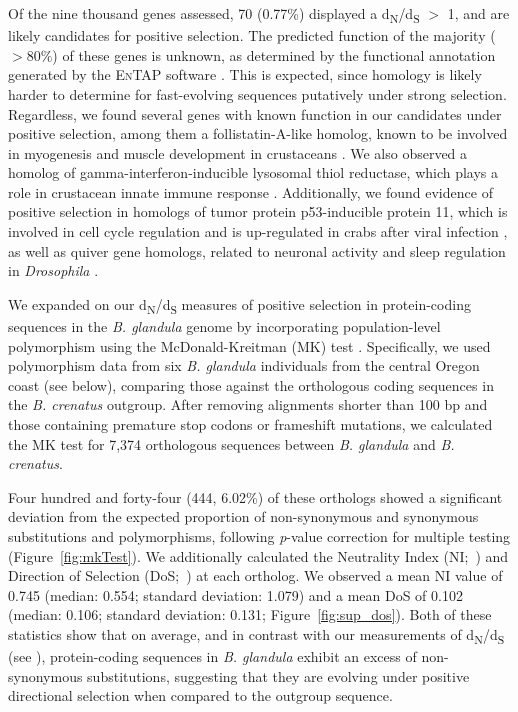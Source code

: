 \documentclass[11pt]{article}
\newcommand{\dnds}{d\textsubscript{N}/d\textsubscript{S}\xspace}
\newcommand{\bgla}{\textit{B. glandula}\xspace}
\begin{document}
Of the nine thousand genes assessed, 70 (0.77\%) displayed a \dnds{} $>$ 1, and are likely
candidates for positive selection.
The predicted function of the majority ($>80\%$) of these genes is unknown, as
determined by the functional annotation generated by the \textsc{EnTAP} software
\citep{hart_span_2020}.
This is expected, since homology is likely harder to determine for fast-evolving sequences
putatively under strong selection.
Regardless, we found several genes with known function in our candidates under
positive selection, among them a follistatin-A-like homolog, known to be involved in
myogenesis and muscle development in crustaceans \citep{yan_identification_2021}.
We also observed a homolog of gamma-interferon-inducible lysosomal thiol reductase,
which plays a role in crustacean innate immune response \citep{liu_involvement_2019}.
Additionally, we found evidence of positive selection in homologs of tumor protein
p53-inducible protein 11, which is involved in cell cycle regulation and is up-regulated
in crabs after viral infection \citep{cheng_p53_2021}, as well as quiver gene homologs,
related to neuronal activity and sleep regulation in \textit{Drosophila}
\citep{wang_quiver_2010}.
\vspace{0.2cm}

We expanded on our \dnds{} measures of positive selection in protein-coding sequences
in the \bgla{} genome by incorporating population-level polymorphism using the
McDonald-Kreitman (MK) test \citep{mcdonald_adaptive_1991}.
Specifically, we used polymorphism data from six \bgla{} individuals from the central
Oregon coast (see below), comparing those against the orthologous coding sequences in
the \textit{B. crenatus} outgroup.
After removing alignments shorter than 100 bp and those containing premature stop
codons or frameshift mutations, we calculated the MK test for 7,374 orthologous
sequences between \bgla{} and \textit{B. crenatus}.
\vspace{0.2cm}

Four hundred and forty-four (444, 6.02\%) of these orthologs showed a significant
deviation from the expected proportion of non-synonymous and synonymous substitutions
and polymorphisms, following \textit{p}-value correction for multiple testing
(Figure~\ref{fig:mkTest}).
We additionally calculated the Neutrality Index (NI;~\citealp{rand_excess_1996}) and
Direction of Selection (DoS;~\citealp{stoletzki_estimation_2011}) at each ortholog.
We observed a mean NI value of 0.745 (median: 0.554; standard deviation: 1.079) and
a mean DoS of 0.102 (median: 0.106; standard deviation: 0.131; Figure~\ref{fig:sup_dos}).
Both of these statistics show that on average, and in contrast with our measurements
of \dnds{} (see ), protein-coding sequences in \bgla{}
exhibit an excess of non-synonymous substitutions, suggesting that they are evolving
under positive directional selection when compared to the outgroup sequence.
\vspace{0.2cm}
\end{document}
